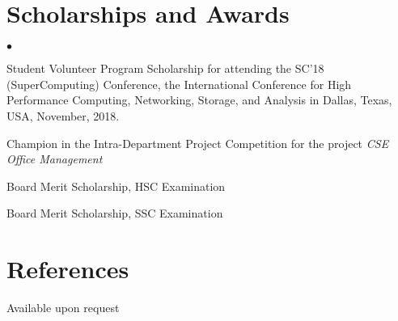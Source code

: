 \documentclass[margin,line]{res}
\newenvironment{list2}{
  \begin{list}{$\bullet$}{%
      \setlength{\itemsep}{0in}
      \setlength{\parsep}{0in} \setlength{\parskip}{0in}
      \setlength{\topsep}{0in} \setlength{\partopsep}{0in} 
      \setlength{\leftmargin}{0.2in}}}{\end{list}}
\begin{document}
\begin{resume}
\section{\sc Scholarships and Awards}
\begin{list2}
\item Student Volunteer Program Scholarship for attending the SC'18 (SuperComputing) Conference, the International Conference for High Performance Computing, Networking, Storage, and Analysis in Dallas, Texas, USA, November, 2018.
\item Champion in the Intra-Department Project Competition for the project \textit{CSE Office Management}
\item Board Merit Scholarship, HSC Examination
\item Board Merit Scholarship, SSC Examination
\end{list2}

\vspace*{-.1in}

\section{\sc References} 
Available upon request

\end{resume}
\end{document}

